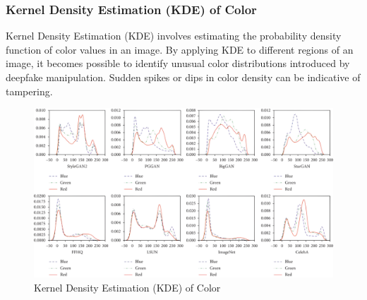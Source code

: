 \subsubsection{Kernel Density Estimation (KDE) of Color}

Kernel Density Estimation (KDE) involves estimating the probability density function of color values in an image. By applying KDE to different regions of an image, it becomes possible to identify unusual color distributions introduced by deepfake manipulation. Sudden spikes or dips in color density can be indicative of tampering.

\begin{figure}[htbp]
    \centering
    \includegraphics[width=5in]{img/KDE.png}
    \caption{Kernel Density Estimation (KDE) of Color}
\end{figure}
